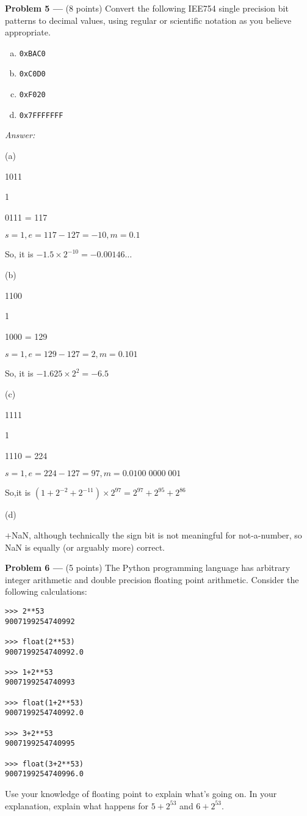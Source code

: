 \documentclass[11pt]{article}
\newcommand{\problem}[1]{\textbf{Problem #1 ---} }
\newcommand{\answer}{{\color{red}\textit{Answer: }}}
\begin{document}
\problem{5}(8 points) Convert the following IEE754 single precision bit patterns to decimal values, using regular or scientific notation as you believe appropriate.
\begin{enumerate}[(a)]
    \item \texttt{0x\;BAC0}
    \item \texttt{0x\;C0D0}
    \item \texttt{0x\;F020}
    \item \texttt{0x\;7FFF\;FFFF}
\end{enumerate}
\answer

(a)

1011

1

0111 = 117

$s=1, e=117-127=-10, m=0.1$

So, it is $-1.5 \times 2^{-10} = -0.00146\ldots $

(b)

1100

1

1000 = 129

$s=1, e=129-127=2, m=0.101$

So, it is $-1.625 \times 2^{2}= -6.5$

(c)

1111

1

1110 = 224 

$s=1, e=224-127=97, m=0.0100\;0000\;001$

So,it is $(1+2^{-2}+2^{-11}) \times 2^{97} = 2^{97}+2^{95}+2^{86}$

(d)

$+$NaN, although technically the sign bit is not meaningful 
for not-a-number, so NaN is equally (or arguably more) correct.

\problem{6}(5 points) The Python programming language has arbitrary integer arithmetic and double precision floating point arithmetic.  Consider the following calculations:
\begin{verbatim}
>>> 2**53
9007199254740992

>>> float(2**53)
9007199254740992.0

>>> 1+2**53
9007199254740993

>>> float(1+2**53)
9007199254740992.0

>>> 3+2**53
9007199254740995

>>> float(3+2**53)
9007199254740996.0
\end{verbatim}
Use your knowledge of floating point to explain what's going on.  In your explanation, explain what happens for $5+2^{53}$ and $6+2^{53}$.
\end{document}
